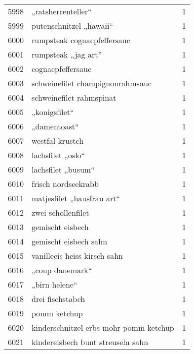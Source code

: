 \begin{tabular}{llr}
5998 &                                 „ratsherrenteller“ &      1 \\
5999 &                            putenschnitzel „hawaii“ &      1 \\
6000 &                        rumpsteak cognacpfeffersauc &      1 \\
6001 &                                rumpsteak „jag art” &      1 \\
6002 &                                  cognacpfeffersauc &      1 \\
6003 &                   schweinefilet champignonrahmsauc &      1 \\
6004 &                           schweinefilet rahmspinat &      1 \\
6005 &                                      „konigsfilet“ &      1 \\
6006 &                                       „damentoast“ &      1 \\
6007 &                                    westfal krustch &      1 \\
6008 &                                  lachsfilet „oslo“ &      1 \\
6009 &                                 lachsfilet „busum“ &      1 \\
6010 &                                frisch nordseekrabb &      1 \\
6011 &                         matjesfilet „hausfrau art“ &      1 \\
6012 &                                 zwei schollenfilet &      1 \\
6013 &                                   gemischt eisbech &      1 \\
6014 &                              gemischt eisbech sahn &      1 \\
6015 &                       vanilleeis heiss kirsch sahn &      1 \\
6016 &                                    „coup danemark“ &      1 \\
6017 &                                      „birn helene“ &      1 \\
6018 &                                   drei fischstabch &      1 \\
6019 &                                       pomm ketchup &      1 \\
6020 &             kinderschnitzel erbs mohr pomm ketchup &      1 \\
6021 &                  kindereisbech bunt streuseln sahn &      1 \\

\end{tabular}
